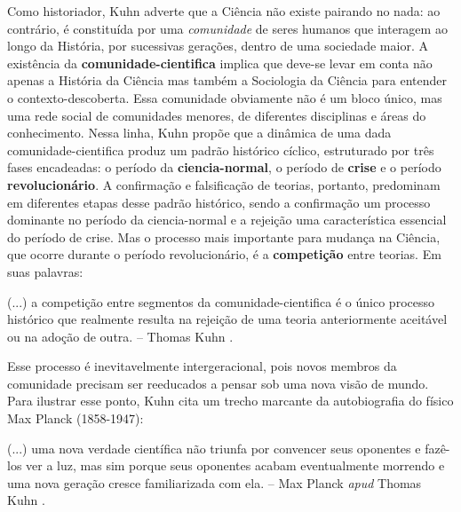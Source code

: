 \documentclass[./main.tex]{subfiles}
\begin{document}
\par Como historiador, Kuhn adverte que a Ciência não existe pairando no nada: ao contrário, é constituída por uma \textit{comunidade} de seres humanos que interagem ao longo da História, por sucessivas gerações, dentro de uma sociedade maior. A existência da \textbf{\gls{comunidade-cientifica}} implica que deve-se levar em conta não apenas a História da Ciência mas também a Sociologia da Ciência para entender o \gls{contexto-descoberta}. Essa comunidade obviamente não é um bloco único, mas uma rede social de comunidades menores, de diferentes disciplinas e áreas do conhecimento. Nessa linha, Kuhn propõe que a dinâmica de uma dada \gls{comunidade-cientifica} produz um padrão histórico cíclico, estruturado por três fases encadeadas: o período da \textbf{\gls{ciencia-normal}}, o período de \textbf{crise} e o período \textbf{revolucionário}. A confirmação e falsificação de teorias, portanto, predominam em diferentes etapas desse padrão histórico, sendo a confirmação um processo dominante no período da \gls{ciencia-normal} e a rejeição uma característica essencial do período de crise. Mas o processo mais importante para mudança na Ciência, que ocorre durante o período revolucionário, é a \textbf{competição} entre teorias. Em suas palavras:

\begin{adjustwidth}{100pt}{0pt}
\medskip
\small (...) a competição entre segmentos da \gls{comunidade-cientifica} é o único processo histórico que realmente resulta na rejeição de uma \gls{teoria} anteriormente aceitável ou na adoção de outra. -- Thomas Kuhn \cite{kuhn2012structure}.
\medskip
\end{adjustwidth}

\noindent Esse processo é inevitavelmente intergeracional, pois novos membros da comunidade precisam ser reeducados a pensar sob uma nova visão de mundo. Para ilustrar esse ponto, Kuhn cita um trecho marcante da autobiografia do físico Max Planck (1858-1947):

\begin{adjustwidth}{100pt}{0pt}
\medskip
\small (...) uma nova verdade científica não triunfa por convencer seus oponentes e fazê-los ver a luz, mas sim porque seus oponentes acabam eventualmente morrendo e uma nova geração cresce familiarizada com ela. -- Max Planck \textit{apud} Thomas Kuhn \cite{kuhn2012structure}.
\medskip
\end{adjustwidth}
\end{document}
